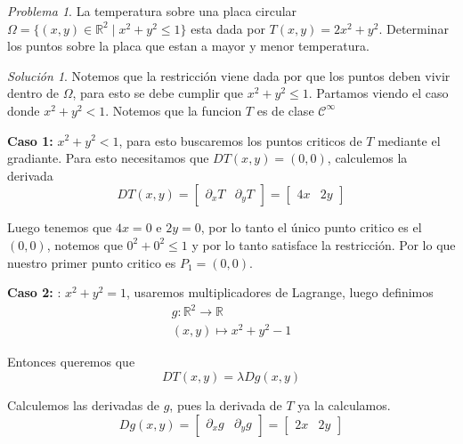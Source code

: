 \documentclass[a4paper,oneside,10.5pt]{article}
\newcommand\RR{\mathbb{R}}
\theoremstyle{definition}
\theoremstyle{plain}
\theoremstyle{remark}
\theoremstyle{theorem}
\newtheorem{prob}{Problema}
\newtheorem{sol}{Solución}
\begin{document}
\begin{prob}
    La temperatura sobre una placa circular $\Omega = \{(x, y) \in \RR^2 \; | \; x^2 + y^2 \leq 1\}$ esta dada por $T(x, y) = 2x^2 + y^2$. Determinar los puntos sobre la placa que estan a mayor y menor temperatura.
\end{prob}

\begin{sol}
    Notemos que la restricción viene dada por que los puntos deben vivir dentro de $\Omega$, para esto se debe cumplir que $x^2 + y^2 \leq 1$. Partamos viendo el caso donde $x^2 + y^2 < 1$. Notemos que la funcion $T$ es de clase $\mathcal{C}^\infty$

    \textbf{Caso 1: } $x^2 + y^2 < 1$, para esto buscaremos los puntos criticos de $T$ mediante el gradiante. Para esto necesitamos que $DT(x, y) = (0,0)$, calculemos la derivada
    \begin{equation*}
        DT(x, y) = \begin{bmatrix}
            \partial_x T & \partial_y T
        \end{bmatrix} = \begin{bmatrix}
            4x & 2y
        \end{bmatrix}
    \end{equation*}

    Luego tenemos que $4x = 0$ e $2y = 0$, por lo tanto el único punto critico es el $(0, 0)$, notemos que $0^2 + 0^2 \leq 1$ y por lo tanto satisface la restricción. Por lo que nuestro primer punto critico es $P_1 = (0, 0)$.

    \textbf{Caso 2: }: $x^2 + y^2 = 1$, usaremos multiplicadores de Lagrange, luego definimos
    \begin{gather*}
        g: \RR^2 \to \RR\\
        (x, y) \mapsto x^2 + y^2 - 1
    \end{gather*}

    Entonces queremos que
    \begin{equation*}
        DT(x, y) = \lambda Dg(x, y)
    \end{equation*}

    Calculemos las derivadas de $g$, pues la derivada de $T$ ya la calculamos.
    \begin{equation*}
        Dg(x, y) = \begin{bmatrix}
            \partial_x g & \partial_y g
        \end{bmatrix} = \begin{bmatrix}
            2x & 2y
        \end{bmatrix}
    \end{equation*}


\end{sol}
\end{document}
